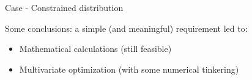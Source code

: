 \documentclass[presentation]{beamer}
\begin{document}
\begin{frame}[label=sec-4-4]{Case - Constrained distribution}
\begin{block}{Some conclusions: a simple (and meaningful) requirement led to:}
\begin{itemize}
\item Mathematical calculations (still feasible)
\item Multivariate optimization (with some numerical tinkering)
\end{itemize}
\end{block}
\end{frame}
\end{document}
